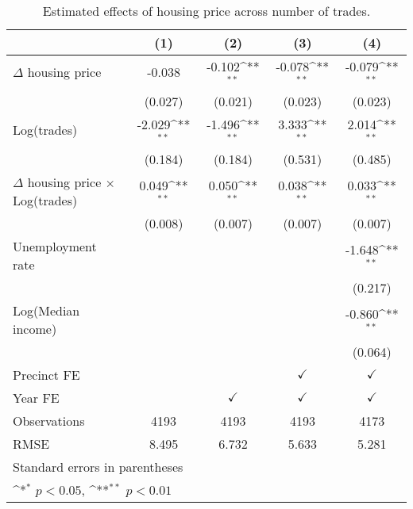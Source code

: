 \begin{table}[htbp]\centering
\def\sym#1{\ifmmode^{#1}\else\(^{#1}\)\fi}
\caption{Estimated effects of housing price across number of trades.} \label{table:econactivity}
\begin{tabular}{l*{4}{c}}
\hline\hline
                    &\multicolumn{1}{c}{(1)}        &\multicolumn{1}{c}{(2)}        &\multicolumn{1}{c}{(3)}        &\multicolumn{1}{c}{(4)}        \\
\hline
$\Delta$ housing price&      -0.038        &      -0.102\sym{**}&      -0.078\sym{**}&      -0.079\sym{**}\\
                    &     (0.027)        &     (0.021)        &     (0.023)        &     (0.023)        \\
[1em]
Log(trades)         &      -2.029\sym{**}&      -1.496\sym{**}&       3.333\sym{**}&       2.014\sym{**}\\
                    &     (0.184)        &     (0.184)        &     (0.531)        &     (0.485)        \\
[1em]
$\Delta$ housing price $\times$ Log(trades)&       0.049\sym{**}&       0.050\sym{**}&       0.038\sym{**}&       0.033\sym{**}\\
                    &     (0.008)        &     (0.007)        &     (0.007)        &     (0.007)        \\
[1em]
Unemployment rate   &                    &                    &                    &      -1.648\sym{**}\\
                    &                    &                    &                    &     (0.217)        \\
[1em]
Log(Median income)  &                    &                    &                    &      -0.860\sym{**}\\
                    &                    &                    &                    &     (0.064)        \\
[1em]
\hline Precinct FE  &                    &                    &$\checkmark$        &$\checkmark$        \\
[1em]
Year FE             &                    &$\checkmark$        &$\checkmark$        &$\checkmark$        \\
\hline
Observations        &        4193        &        4193        &        4193        &        4173        \\
RMSE                &       8.495        &       6.732        &       5.633        &       5.281        \\
\hline\hline
\multicolumn{5}{l}{\footnotesize Standard errors in parentheses}\\
\multicolumn{5}{l}{\footnotesize \sym{*} \(p<0.05\), \sym{**} \(p<0.01\)}\\
\end{tabular}
\end{table}
